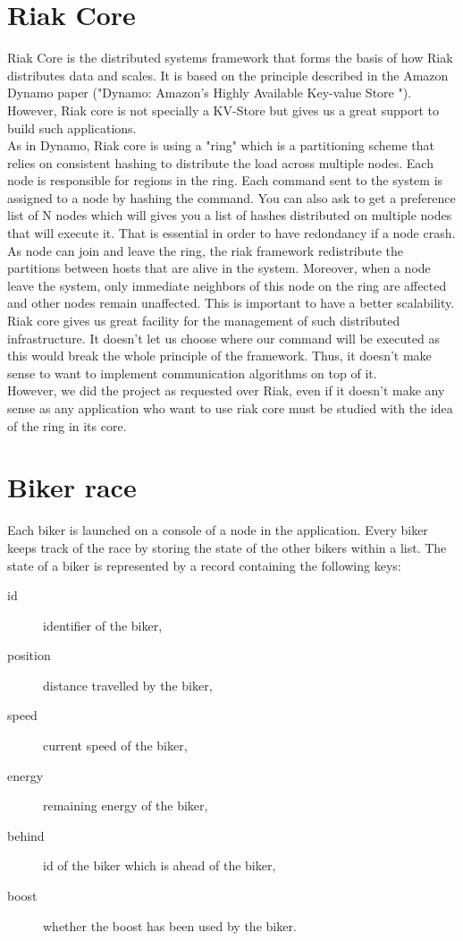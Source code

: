 \documentclass[a4paper, 11pt]{article}
\begin{document}
\section{Riak Core}

Riak Core is the distributed systems framework that forms the basis of how Riak distributes data and scales. It is based on the principle described in the Amazon Dynamo paper ("Dynamo: Amazon’s Highly Available Key-value Store "). However, Riak core is not specially a KV-Store but gives us a great support to build such applications. \\

As in Dynamo, Riak core is using a "ring" which is a partitioning scheme that relies on consistent hashing to distribute the load across multiple nodes. Each node is responsible for regions in the ring. Each command sent to the system is assigned to a node by hashing the command. You can also ask to get a preference list of N nodes which will gives you a list of hashes distributed on multiple nodes that will execute it. That is essential in order to have redondancy if a node crash. As node can join and leave the ring, the riak framework redistribute the partitions between hosts that are alive in the system. Moreover, when a node leave the system, only immediate neighbors of this node on the ring are affected and other nodes remain unaffected. This is important to have a better scalability.\\

Riak core gives us great facility for the management of such distributed infrastructure. It doesn't let us choose where our command will be executed as this would break the whole principle of the framework. Thus, it doesn't make sense to want to implement communication algorithms on top of it. \\

However, we did the project as requested over Riak, even if it doesn't make any sense as any application who want to use riak core must be studied with the idea of the ring in its core. \\

\section{Biker race}

Each biker is launched on a console of a node in the application.
Every biker keeps track of the race by storing the state of the other bikers within a list.
The state of a biker is represented by a record containing the following keys:
\begin{description}
	\item[id] identifier of the biker,
	\item[position] distance travelled by the biker,
	\item[speed] current speed of the biker,
	\item[energy] remaining energy of the biker,
	\item[behind] id of the biker which is ahead of the biker,
	\item[boost] whether the boost has been used by the biker.
\end{description}
\end{document}
